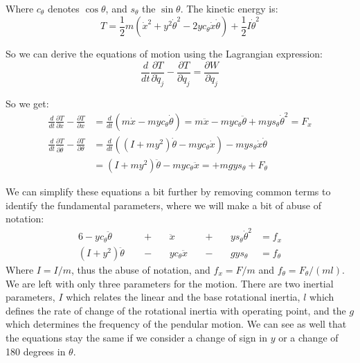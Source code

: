 Where $c_\theta$ denotes $\cos \theta$, and $s_\theta$ the $\sin \theta$. The kinetic energy is:
\begin{equation}
	T = \frac{1}{2} m \left(\dot{x}^2 + y^2 \dot{\theta}^2 - 2 y c_\theta  \dot{x} \dot{\theta} \right) + \frac{1}{2}I\dot{\theta}^2
\end{equation}

So we can derive the equations of motion using the Lagrangian expression:
\begin{equation}
	\frac{d}{dt}\frac{\partial T}{\partial \dot{q}_j}-\frac{\partial T}{\partial q_j} = \frac{\partial W}{\partial q_j}
\end{equation}

So we get:
\begin{align}
	\frac{d}{dt}\frac{\partial T}{\partial \dot{x}}-\frac{\partial T}{\partial x} &=
	 \frac{d}{dt}\left(m \dot{x} - m y c_\theta \dot{\theta} \right) = 
	m \ddot{x} - m y c_\theta \ddot{\theta} + m y s_\theta \dot{\theta}^2 = F_x \\
	\frac{d}{dt}\frac{\partial T}{\partial \dot{\theta}}-\frac{\partial T}{\partial \theta} &=
	\frac{d}{dt} \left((I+m y^2) \dot{\theta} - m y c_\theta  \dot{x} \right) - m y s_\theta  \dot{x} \dot{\theta} \\  &=
	\left(I+m y^2\right) \ddot{\theta} - m y c_\theta \ddot{x} = + m g y s_\theta + F_\theta
\end{align}

We can simplify these equations a bit further by removing common terms to identify the fundamental parameters, where we will make a bit of abuse of notation:
\begin{alignat}{6}
	-y c_\theta \ddot{\theta} 	&& \ + \ && \ddot{x}  		 && \ + \ && y s_\theta \dot{\theta}^2 &= f_x \\
	(I+y^2) \ddot{\theta} \		&& \ - \ && y c_\theta \ddot{x} && \ - \ && g y s_\theta                 &= f_\theta
\end{alignat}
Where $I=I/m$, thus the abuse of notation, and $f_x=F/m$ and $f_\theta=F_\theta/(ml)$. We are left with only three parameters for the motion. There are two inertial parameters, $I$ which relates the linear and the base rotational inertia, $l$ which defines the rate of change of the rotational inertia with operating point, and the $g$ which determines the frequency of the pendular motion. 
We can see as well that the equations stay the same if we consider a change of sign in $y$ or a change of 180 degrees in $\theta$.

